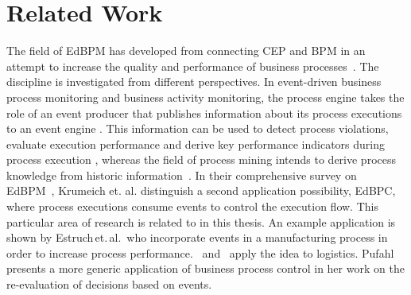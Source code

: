 \chapter{Related Work}\label{ch:relatedwork}


The field of \acf{EdBPM} has developed from connecting \ac{CEP} and \ac{BPM} in an attempt to increase the quality and performance of business processes~\cite{luckham2008power}.
The discipline is investigated from different perspectives.
In event-driven business process monitoring and business activity monitoring, the process engine takes the role of an event producer that publishes information about its process executions to an event engine \cite{baumgrass2014bpmn, herzberg2013improving, bulow2013monitoring}. 
This information can be used to detect process violations, evaluate execution performance and derive key performance indicators during process execution \cite{janiesch2011blueprint, janiesch:poc-eventdriven-bam}, whereas the field of process mining intends to derive process knowledge from historic information~\cite{tiwari2008review}.
In their comprehensive survey on \ac{EdBPM}~\cite{Krumeich2014EventDrivenBP}, Krumeich et. al. distinguish a second application possibility, \acf{EdBPC}, where process executions consume events to control the execution flow. This particular area of research is related to in this thesis. %
An example application is shown by Estruch\,et.\,al.\,\cite{estruch2012event} who incorporate events in a manufacturing process in order to increase process performance. \cite{Cabanillas2014}~and~\cite{Baumgrass2016} apply the idea to logistics.
Pufahl~\cite{Pufahl2017} presents a more generic application of business process control in her work on the re-evaluation of decisions based on events.


